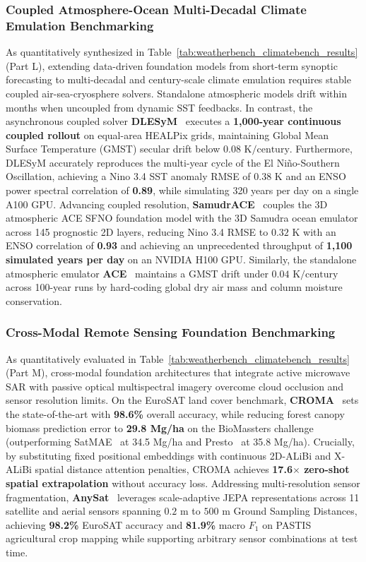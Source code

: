 \subsubsection{Coupled Atmosphere-Ocean Multi-Decadal Climate Emulation Benchmarking}
As quantitatively synthesized in Table~\ref{tab:weatherbench_climatebench_results} (Part L), extending data-driven foundation models from short-term synoptic forecasting to multi-decadal and century-scale climate emulation requires stable coupled air-sea-cryosphere solvers. Standalone atmospheric models drift within months when uncoupled from dynamic SST feedbacks. In contrast, the asynchronous coupled solver \textbf{DLESyM}~\cite{cresswellclay2024dlesym} executes a \textbf{1,000-year continuous coupled rollout} on equal-area HEALPix grids, maintaining Global Mean Surface Temperature (GMST) secular drift below \textbf{$0.08\text{ K/century}$}. Furthermore, DLESyM accurately reproduces the multi-year cycle of the El Ni\~no-Southern Oscillation, achieving a Nino 3.4 SST anomaly RMSE of \textbf{$0.38\text{ K}$} and an ENSO power spectral correlation of \textbf{0.89}, while simulating 320 years per day on a single A100 GPU. Advancing coupled resolution, \textbf{SamudrACE}~\cite{duncan2025samudrace} couples the 3D atmospheric ACE SFNO foundation model with the 3D Samudra ocean emulator across 145 prognostic 2D layers, reducing Nino 3.4 RMSE to \textbf{$0.32\text{ K}$} with an ENSO correlation of \textbf{0.93} and achieving an unprecedented throughput of \textbf{1,100 simulated years per day} on an NVIDIA H100 GPU. Similarly, the standalone atmospheric emulator \textbf{ACE}~\cite{wattmeyer2024ace} maintains a GMST drift under \textbf{$0.04\text{ K/century}$} across 100-year runs by hard-coding global dry air mass and column moisture conservation.

\subsubsection{Cross-Modal Remote Sensing Foundation Benchmarking}
As quantitatively evaluated in Table~\ref{tab:weatherbench_climatebench_results} (Part M), cross-modal foundation architectures that integrate active microwave SAR with passive optical multispectral imagery overcome cloud occlusion and sensor resolution limits. On the EuroSAT land cover benchmark, \textbf{CROMA}~\cite{fuller2023croma} sets the state-of-the-art with \textbf{98.6\%} overall accuracy, while reducing forest canopy biomass prediction error to \textbf{29.8 Mg/ha} on the BioMassters challenge (outperforming SatMAE~\cite{cong2022satmae} at 34.5 Mg/ha and Presto~\cite{tseng2023presto} at 35.8 Mg/ha). Crucially, by substituting fixed positional embeddings with continuous 2D-ALiBi and X-ALiBi spatial distance attention penalties, CROMA achieves \textbf{17.6$\times$ zero-shot spatial extrapolation} without accuracy loss. Addressing multi-resolution sensor fragmentation, \textbf{AnySat}~\cite{astruc2024anysat} leverages scale-adaptive JEPA representations across 11 satellite and aerial sensors spanning $0.2\text{ m}$ to $500\text{ m}$ Ground Sampling Distances, achieving \textbf{98.2\%} EuroSAT accuracy and \textbf{81.9\%} macro $F_1$ on PASTIS agricultural crop mapping while supporting arbitrary sensor combinations at test time.

